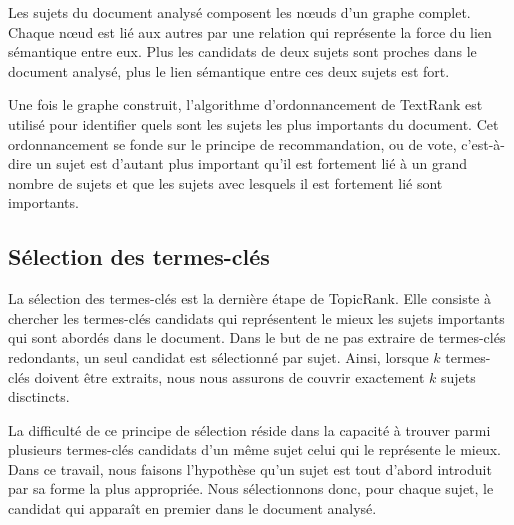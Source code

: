     Les sujets du document analysé composent les n\oe{}uds d'un graphe complet.
    Chaque n\oe{}ud est lié aux autres par une relation qui représente la force
    du lien sémantique entre eux. Plus les candidats de deux sujets sont proches
    dans le document analysé, plus le lien sémantique entre ces deux sujets est
    fort.

    Une fois le graphe construit, l'algorithme d'ordonnancement de TextRank est
    utilisé pour identifier quels sont les sujets les plus importants du
    document. Cet ordonnancement se fonde sur le principe de recommandation,
    ou de vote, c'est-à-dire un sujet est d'autant plus important qu'il est
    fortement lié à un grand nombre de sujets et que les sujets avec lesquels il
    est fortement lié sont importants.

  \subsection{Sélection des termes-clés}
  \label{subsec:selection_des_termes_cles}
    La sélection des termes-clés est la dernière étape de TopicRank. Elle
    consiste à chercher les termes-clés candidats qui représentent le mieux les
    sujets importants qui sont abordés dans le document. Dans le but de ne pas
    extraire de termes-clés redondants, un seul candidat est sélectionné par
    sujet.
    Ainsi, lorsque $k$ termes-clés doivent être extraits, nous nous assurons
    de couvrir exactement $k$ sujets disctincts.

    La difficulté de ce principe de sélection réside dans la capacité à trouver
    parmi plusieurs termes-clés candidats d'un même sujet celui qui le
    représente le mieux. Dans ce travail, nous faisons l'hypothèse qu'un sujet
    est tout d'abord introduit par sa forme la plus appropriée. Nous
    sélectionnons donc, pour chaque sujet, le candidat qui apparaît en premier
    dans le document analysé.

